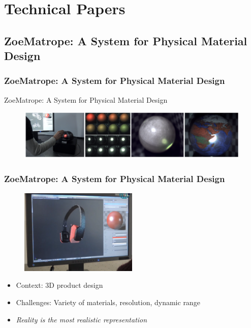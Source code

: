 \section{Technical Papers}
\subsection{ZoeMatrope: A System for Physical Material Design}
\frame
{
	\frametitle{ZoeMatrope: A System for Physical Material Design}
	ZoeMatrope: A System for Physical Material Design \cite{Miyashita:2016}
	
	\begin{figure}
		\centering
		\includegraphics[width=1.0\textwidth]{img/zoematrope/zoematrope.png}
	\end{figure}
}

\frame
{
	\frametitle{ZoeMatrope: A System for Physical Material Design}
	
	\begin{figure}
		\centering
		\includegraphics[width=0.5\textwidth]{img/zoematrope/design.png}
	\end{figure}
	
	\begin{itemize}[<+->]
		\item Context: 3D product design
		\item Challenges: Variety of materials, resolution, dynamic range
		\item \textit{Reality is the most realistic representation}
	\end{itemize}
}

